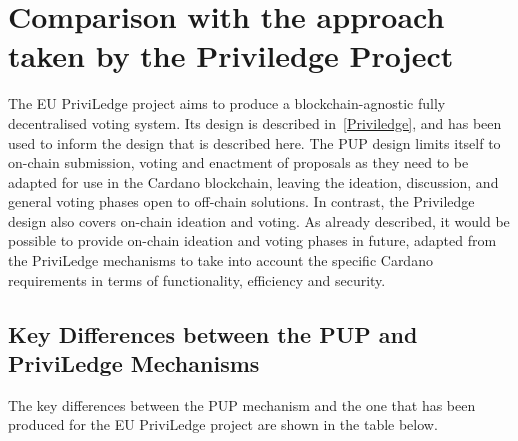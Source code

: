 \section{Comparison with the approach taken by the Priviledge Project}
\label{sect:priviledge}

The EU PriviLedge project aims to produce a blockchain-agnostic fully decentralised voting system.
Its design is described in~\ref{Priviledge}, and has been used to inform the design that is described here.
The PUP design limits itself to on-chain submission, voting and enactment of proposals as they need to be
adapted for use in the Cardano blockchain, leaving the ideation, discussion, and general voting phases open to off-chain solutions.
In contrast, the Priviledge design also covers on-chain ideation and voting.
As already described, it would be possible to provide on-chain ideation and voting phases in future, adapted from the PriviLedge
mechanisms to take into account the specific Cardano requirements in terms of functionality, efficiency and security.

\subsection{Key Differences between the PUP and PriviLedge Mechanisms}

The key differences between the PUP mechanism and the one that has been produced for the EU PriviLedge project are shown in the table below.

